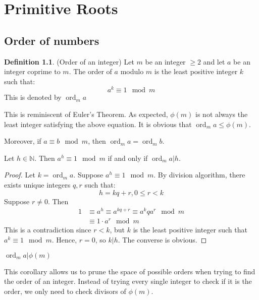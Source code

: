 \documentclass[12pt,letterpaper]{book}
\theoremstyle{definition}
\newtheorem{definition}{Definition} %
\newcommand{\N}{\mathbb{N}}
\DeclareMathOperator{\ord}{ord}
\begin{document}
\chapter{Primitive Roots}

\section{Order of numbers}

\begin{definition} (Order of an integer)
  Let $m$ be an integer $\geq 2$ and let $a$ be an integer coprime to $m$. The order of $a$ modulo $m$  is the least positive integer $k$ such that:
  \[a^k \equiv 1 \mod m\]
  This is denoted by $\ord_m a$
\end{definition}

This is reminiscent of Euler's Theorem. As expected, $\phi(m)$ is not always the least integer satisfying the above equation. It is obvious that $\ord_m a \leq \phi(m)$.

Moreover, if $a \equiv b \mod m$, then $\ord_m a = \ord_m b$.

\begin{lemma}
  Let $h \in \N$. Then $a^h \equiv 1 \mod m$ if and only if $\ord_m a | h$. 
\end{lemma}
\begin{proof}
  Let $k = \ord_m a$. Suppose $a^h \equiv 1 \mod m$. By division algorithm, there exists unique integers $q,r$ such that:
  \[h = kq+r, 0 \leq r < k\]
  Suppose $r \neq 0$. Then
  \begin{align*}
     1 &\equiv a^h \equiv a^{kq+r} \equiv a^kq a^r \mod m \\
       &\equiv 1 \cdot a^r \mod m
  \end{align*}
  This is a contradiction since $r < k$, but $k$ is the least positive integer such that $a^k \equiv 1 \mod m$. Hence, $r = 0$, so $k|h$. The converse is obvious.
\end{proof}

\begin{corollary}
  $\ord_m a | \phi(m)$ 
\end{corollary}

This corollary allows us to prune the space of possible orders when trying to find the order of an integer. Instead of trying every single integer to check if it is the order, we only need to check divisors of $\phi(m)$.
\end{document}
